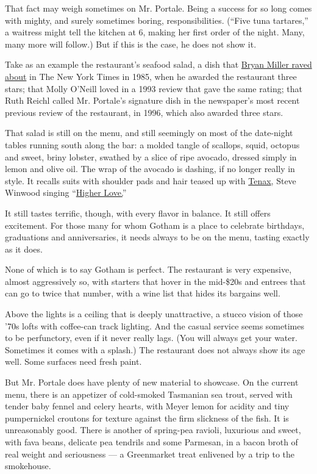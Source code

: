 That fact may weigh sometimes on Mr. Portale. Being a success for so
long comes with mighty, and surely sometimes boring, responsibilities.
(``Five tuna tartares,'' a waitress might tell the kitchen at 6, making
her first order of the night. Many, many more will follow.) But if this
is the case, he does not show it.

Take as an example the restaurant's seafood salad, a dish that
\href{http://www.nytimes3xbfgragh.onion/1985/10/04/arts/resaturants.html}{Bryan
Miller raved about} in The New York Times in 1985, when he awarded the
restaurant three stars; that Molly O'Neill loved in a 1993 review that
gave the same rating; that Ruth Reichl called Mr. Portale's signature
dish in the newspaper's most recent previous review of the restaurant,
in 1996, which also awarded three stars.

That salad is still on the menu, and still seemingly on most of the
date-night tables running south along the bar: a molded tangle of
scallops, squid, octopus and sweet, briny lobster, swathed by a slice of
ripe avocado, dressed simply in lemon and olive oil. The wrap of the
avocado is dashing, if no longer really in style. It recalls suits with
shoulder pads and hair teased up with
\href{http://www.flickr.com/photos/ajbear/3293720226/}{Tenax}, Steve
Winwood singing
``\href{http://vodpod.com/watch/1476909-steve-winwood-higher-love}{Higher
Love.}''

It still tastes terrific, though, with every flavor in balance. It still
offers excitement. For those many for whom Gotham is a place to
celebrate birthdays, graduations and anniversaries, it needs always to
be on the menu, tasting exactly as it does.

None of which is to say Gotham is perfect. The restaurant is very
expensive, almost aggressively so, with starters that hover in the
mid-\$20s and entrees that can go to twice that number, with a wine list
that hides its bargains well.

Above the lights is a ceiling that is deeply unattractive, a stucco
vision of those '70s lofts with coffee-can track lighting. And the
casual service seems sometimes to be perfunctory, even if it never
really lags. (You will always get your water. Sometimes it comes with a
splash.) The restaurant does not always show its age well. Some surfaces
need fresh paint.

But Mr. Portale does have plenty of new material to showcase. On the
current menu, there is an appetizer of cold-smoked Tasmanian sea trout,
served with tender baby fennel and celery hearts, with Meyer lemon for
acidity and tiny pumpernickel croutons for texture against the firm
slickness of the fish. It is unreasonably good. There is another of
spring-pea ravioli, luxurious and sweet, with fava beans, delicate pea
tendrils and some Parmesan, in a bacon broth of real weight and
seriousness --- a Greenmarket treat enlivened by a trip to the
smokehouse.

